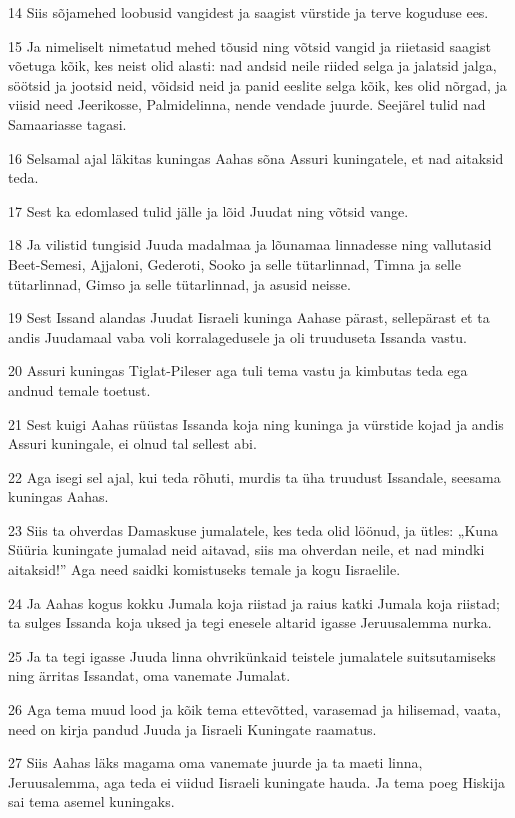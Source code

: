 \par 14 Siis sõjamehed loobusid vangidest ja saagist vürstide ja terve koguduse ees.
\par 15 Ja nimeliselt nimetatud mehed tõusid ning võtsid vangid ja riietasid saagist võetuga kõik, kes neist olid alasti: nad andsid neile riided selga ja jalatsid jalga, söötsid ja jootsid neid, võidsid neid ja panid eeslite selga kõik, kes olid nõrgad, ja viisid need Jeerikosse, Palmidelinna, nende vendade juurde. Seejärel tulid nad Samaariasse tagasi.
\par 16 Selsamal ajal läkitas kuningas Aahas sõna Assuri kuningatele, et nad aitaksid teda.
\par 17 Sest ka edomlased tulid jälle ja lõid Juudat ning võtsid vange.
\par 18 Ja vilistid tungisid Juuda madalmaa ja lõunamaa linnadesse ning vallutasid Beet-Semesi, Ajjaloni, Gederoti, Sooko ja selle tütarlinnad, Timna ja selle tütarlinnad, Gimso ja selle tütarlinnad, ja asusid neisse.
\par 19 Sest Issand alandas Juudat Iisraeli kuninga Aahase pärast, sellepärast et ta andis Juudamaal vaba voli korralagedusele ja oli truuduseta Issanda vastu.
\par 20 Assuri kuningas Tiglat-Pileser aga tuli tema vastu ja kimbutas teda ega andnud temale toetust.
\par 21 Sest kuigi Aahas rüüstas Issanda koja ning kuninga ja vürstide kojad ja andis Assuri kuningale, ei olnud tal sellest abi.
\par 22 Aga isegi sel ajal, kui teda rõhuti, murdis ta üha truudust Issandale, seesama kuningas Aahas.
\par 23 Siis ta ohverdas Damaskuse jumalatele, kes teda olid löönud, ja ütles: „Kuna Süüria kuningate jumalad neid aitavad, siis ma ohverdan neile, et nad mindki aitaksid!” Aga need saidki komistuseks temale ja kogu Iisraelile.
\par 24 Ja Aahas kogus kokku Jumala koja riistad ja raius katki Jumala koja riistad; ta sulges Issanda koja uksed ja tegi enesele altarid igasse Jeruusalemma nurka.
\par 25 Ja ta tegi igasse Juuda linna ohvrikünkaid teistele jumalatele suitsutamiseks ning ärritas Issandat, oma vanemate Jumalat.
\par 26 Aga tema muud lood ja kõik tema ettevõtted, varasemad ja hilisemad, vaata, need on kirja pandud Juuda ja Iisraeli Kuningate raamatus.
\par 27 Siis Aahas läks magama oma vanemate juurde ja ta maeti linna, Jeruusalemma, aga teda ei viidud Iisraeli kuningate hauda. Ja tema poeg Hiskija sai tema asemel kuningaks.


